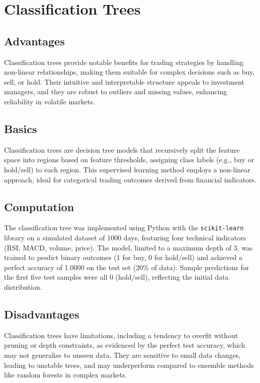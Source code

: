 \documentclass{article}
\begin{document}
\section{Classification Trees}
\label{sec:classification_trees}

\subsection{Advantages}
Classification trees provide notable benefits for trading strategies by handling non-linear relationships, making them suitable for complex decisions such as buy, sell, or hold. Their intuitive and interpretable structure appeals to investment managers, and they are robust to outliers and missing values, enhancing reliability in volatile markets.

\subsection{Basics}
Classification trees are decision tree models that recursively split the feature space into regions based on feature thresholds, assigning class labels (e.g., buy or hold/sell) to each region. This supervised learning method employs a non-linear approach, ideal for categorical trading outcomes derived from financial indicators.

\subsection{Computation}
The classification tree was implemented using Python with the \texttt{scikit-learn} library on a simulated dataset of 1000 days, featuring four technical indicators (RSI, MACD, volume, price). The model, limited to a maximum depth of 3, was trained to predict binary outcomes (1 for buy, 0 for hold/sell) and achieved a perfect accuracy of 1.0000 on the test set (20\% of data). Sample predictions for the first five test samples were all 0 (hold/sell), reflecting the initial data distribution.

\subsection{Disadvantages}
Classification trees have limitations, including a tendency to overfit without pruning or depth constraints, as evidenced by the perfect test accuracy, which may not generalise to unseen data. They are sensitive to small data changes, leading to unstable trees, and may underperform compared to ensemble methods like random forests in complex markets.
\end{document}

